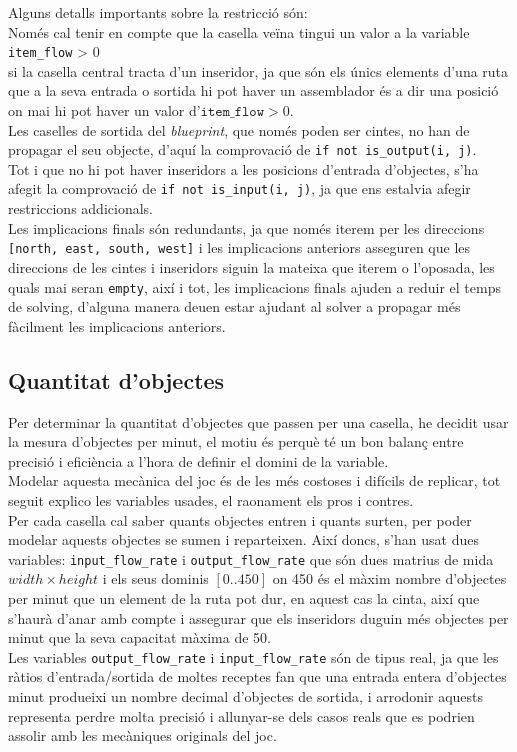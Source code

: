 Alguns detalls importants sobre la restricció són:\\
Només cal tenir en compte que la casella veïna tingui un valor a la variable \texttt{item\_flow} > 0 \\ si la casella central tracta d'un inseridor, ja que són els únics elements d'una ruta que a la seva entrada o sortida hi pot haver un assemblador és a dir una posició on mai hi pot haver un valor d'$\texttt{item\_flow} > 0$.\\

Les caselles de sortida del \textit{blueprint}, que només poden ser cintes, no han de propagar el seu objecte, d'aquí la comprovació de \texttt{if not is\_output(i, j)}.\\

Tot i que no hi pot haver inseridors a les posicions d'entrada d'objectes, s'ha afegit la comprovació de \texttt{if not is\_input(i, j)}, ja que ens estalvia afegir restriccions addicionals.\\

Les implicacions finals són redundants, ja que només iterem per les direccions \texttt{[north, east, south, west]} i les implicacions anteriors asseguren que les direccions de les cintes i inseridors siguin la mateixa que iterem o l'oposada, les quals mai seran \texttt{empty}, així i tot, les implicacions finals ajuden a reduir el temps de solving, d'alguna manera deuen estar ajudant al solver a propagar més fàcilment les implicacions anteriors.

\subsection{Quantitat d'objectes}
Per determinar la quantitat d'objectes que passen per una casella, he decidit usar la mesura d'objectes per minut, el motiu és perquè té un bon balanç entre precisió i eficiència a l'hora de definir el domini de la variable.\\
Modelar aquesta mecànica del joc és de les més costoses i difícils de replicar, tot seguit explico les variables usades, el raonament els pros i contres.\\
Per cada casella cal saber quants objectes entren i quants surten, per poder modelar aquests objectes se sumen i reparteixen. Així doncs, s'han usat dues variables: \texttt{input\_flow\_rate} i \texttt{output\_flow\_rate} que són dues matrius de mida $width \times height$ i els seus dominis $[0..450]$ on 450 és el màxim nombre d'objectes per minut que un element de la ruta pot dur, en aquest cas la cinta, així que s'haurà d'anar amb compte i assegurar que els inseridors duguin més objectes per minut que la seva capacitat màxima de 50.\\
Les variables \texttt{output\_flow\_rate} i \texttt{input\_flow\_rate} són de tipus real, ja que les ràtios d'entrada/sortida de moltes receptes fan que una entrada entera d'objectes minut produeixi un nombre decimal d'objectes de sortida, i arrodonir aquests representa perdre molta precisió i allunyar-se dels casos reals que es podrien assolir amb les mecàniques originals del joc.

